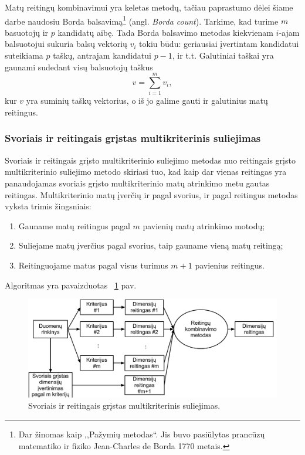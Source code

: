 Matų reitingų kombinavimui yra keletas metodų\cite{dwork2001rank}, tačiau paprastumo dėlei šiame darbe naudosiu Borda balsavimą\footnote{Dar žinomas kaip ,,Pažymių metodas``. Jis buvo pasiūlytas prancūzų matematiko ir fiziko Jean-Charles de Borda 1770 metais.} (angl. \textit{Borda count}). Tarkime, kad turime $m$ basuotojų ir $p$ kandidatų aibę. Tada Borda balsavimo metodas kiekvienam $i$-ajam balsuotojui sukuria balsų vektorių $v_i$ tokiu būdu: geriausiai įvertintam kandidatui suteikiama $p$ taškų, antrajam kandidatui $p-1$, ir t.t. Galutiniai taškai yra gaunami sudedant visų balsuotojų taškus
\begin{equation}
 v = \sum_{i=1}^m v_i,
\end{equation}
kur $v$ yra suminių taškų vektorius, o iš jo galime gauti ir galutinius matų reitingus.

\subsubsection{Svoriais ir reitingais grįstas multikriterinis suliejimas}

Svoriais ir reitingais grįsto multikriterinio suliejimo metodas nuo reitingais grįsto multikriterinio suliejimo metodo skiriasi tuo, kad kaip dar vienas reitingas yra panaudojamas svoriais grįsto multikriterinio matų atrinkimo metu gautas reitingas.
Multikriterinio matų įverčių ir pagal svorius, ir pagal reitingus metodas vyksta trimis žingsniais:
\begin{enumerate}
  \item Gauname matų reitingus pagal $m$ pavienių matų atrinkimo motodų;
  \item Suliejame matų įverčius pagal svorius, taip gauname vieną matų reitingą;
  \item Reitinguojame matus pagal visus turimus $m+1$ pavienius reitingus.
\end{enumerate} 
Algoritmas yra pavaizduotas ~\ref{fig:figure3} pav.
\begin{figure}
 \centering
 \includegraphics[width=1\textwidth]{../bachelor/images/score_and_ranking_based_fusion.pdf}
 \caption{Svoriais ir reitingais grįstas multikriterinis suliejimas.}
 \label{fig:figure3}
\end{figure}

